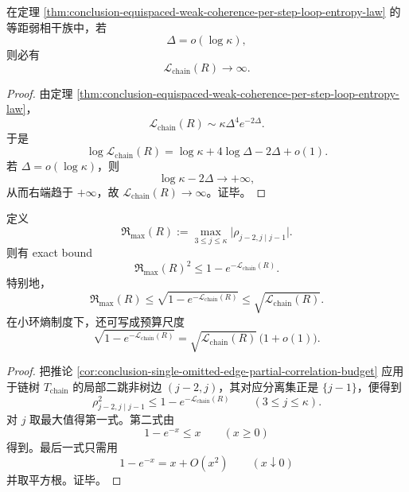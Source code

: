 \begin{corollary}[次对数间距不可能维持有限体积亏损]\label{cor:conclusion-sublog-spacing-forces-divergent-loop-entropy}
在定理 \ref{thm:conclusion-equispaced-weak-coherence-per-step-loop-entropy-law} 的等距弱相干族中，若
\[
\Delta=o(\log\kappa),
\]
则必有
\[
\mathcal L_{\mathrm{chain}}(R)\to\infty.
\]
\end{corollary}
\begin{proof}
由定理 \ref{thm:conclusion-equispaced-weak-coherence-per-step-loop-entropy-law}，
\[
\mathcal L_{\mathrm{chain}}(R)\sim \kappa\Delta^4e^{-2\Delta}.
\]
于是
\[
\log \mathcal L_{\mathrm{chain}}(R)
=
\log\kappa+4\log\Delta-2\Delta+o(1).
\]
若 \(\Delta=o(\log\kappa)\)，则
\[
\log\kappa-2\Delta\to+\infty,
\]
从而右端趋于 \(+\infty\)，故 \(\mathcal L_{\mathrm{chain}}(R)\to\infty\)。证毕。
\end{proof}

\begin{theorem}[链树投影把局部条件相关统一压入单一标量预算]\label{thm:conclusion-chain-tree-single-scalar-budget-controls-local-partial-correlations}
定义
\[
\mathfrak R_{\max}(R):=
\max_{3\le j\le \kappa}\bigl|\rho_{j-2,j\mid j-1}\bigr|.
\]
则有 exact bound
\[
\mathfrak R_{\max}(R)^2\le 1-e^{-\mathcal L_{\mathrm{chain}}(R)}.
\]
特别地，
\[
\mathfrak R_{\max}(R)\le \sqrt{1-e^{-\mathcal L_{\mathrm{chain}}(R)}}\le \sqrt{\mathcal L_{\mathrm{chain}}(R)}.
\]
在小环熵制度下，还可写成预算尺度
\[
\sqrt{1-e^{-\mathcal L_{\mathrm{chain}}(R)}}=
\sqrt{\mathcal L_{\mathrm{chain}}(R)}\,\bigl(1+o(1)\bigr).
\]
\end{theorem}
\begin{proof}
把推论 \ref{cor:conclusion-single-omitted-edge-partial-correlation-budget} 应用于链树 \(T_{\mathrm{chain}}\) 的局部二跳非树边 \((j-2,j)\)，其对应分离集正是 \(\{j-1\}\)，便得到
\[
\rho_{j-2,j\mid j-1}^2\le 1-e^{-\mathcal L_{\mathrm{chain}}(R)}
\qquad (3\le j\le \kappa).
\]
对 \(j\) 取最大值得第一式。第二式由
\[
1-e^{-x}\le x
\qquad (x\ge 0)
\]
得到。最后一式只需用
\[
1-e^{-x}=x+O(x^2)
\qquad (x\downarrow 0)
\]
并取平方根。证毕。
\end{proof}

